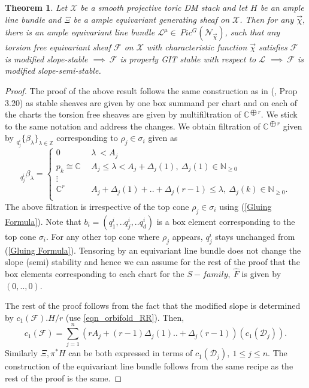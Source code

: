 \documentclass[10pt]{amsart}
\newtheorem{thm}[prop]{Theorem}
\newcommand{\sX}{{\mathcal X}}
\numberwithin{equation}{subsection}
\begin{document}
\begin{thm}\label{slope stability}
Let $\sX$ be a smooth projective toric DM stack and let  $H$ be an
ample line bundle and $\Xi$ be a ample equivariant generating sheaf on $\sX$. Then for any $\vec\chi,$ there is an ample equivariant line bundle
$\mathscr{L}^\mu\in\  Pic^G(\mathscr{N}_{\vec\chi})$, such that any torsion free equivariant sheaf $\mathscr{F}$ on $\sX$ with characteristic 
function $\vec\chi$ satisfies
$\mathscr{F}$ is modified slope-stable $\implies \ \mathscr{F}$  is properly GIT stable with respect to $\mathscr{L}$ $\implies\ \mathscr{F} $ is modified slope-semi-stable.    
\end{thm}
\begin{proof}
The proof of the above result follows the same construction as in (\cite{Koo2}, Prop 3.20) as stable sheaves are given by one box summand per chart and on each of the charts the torsion free sheaves are given by multifiltration of $\mathbb{C}^{\bigoplus r}$. We stick to the same notation and address the changes. \newline We obtain filtration of $\mathbb{C}^{\bigoplus r}$ given by $_{q^i_j}\{\beta_{\lambda}\}_{\lambda \in \mathbb{Z}}$ corresponding to $\rho_j\in \sigma_i$ given as
$$_{q^i_j}\beta_\lambda=\left\{ 
\begin{array}{ll}
0 & \ \ \lambda\ < A_j\ \\[2ex]
p_k \cong \mathbb{C} & \ \ A_j \leq \lambda < A_j+\Delta_j(1),\  \Delta_j(1) \in \mathbb{N}_{\geq0}\ \\[2ex]
\vdots\\
\mathbb{C}^r & \ \   A_j+\Delta_j(1)+..+\Delta_j(r-1)\leq \lambda,\ \Delta_j(k) \in \mathbb{N}_{\geq0}.\\\
\end{array}
\right.$$ 
The above filtration is irrespective of the top cone $\rho_j\in \sigma_i$ using (\ref{Gluing Formula}). Note that $b_i=(q^i_1,..q^i_j,..q^i_d)$ is a box element corresponding to the top cone $\sigma_i.$ For any other top cone where $\rho_j$ appears, $q^i_j$ stays unchanged from (\ref{Gluing Formula}). Tensoring by an equivariant line bundle does not change the slope (semi) stability and hence we can assume for the rest of the proof that the box elements corresponding to each chart for the $S-family,\ \hat F$ is given by $(0,..,0).$\par
The rest of the proof follows from the fact that the modified slope is determined by $c_1(\mathscr{F}).H/r$ (use \ref{eqn_orbifold_RR}). 
Then,
$$c_1(\mathscr{F})=\sum_{j=1}^{n}(rA_j+(r-1)\Delta_{j}(1)..+\Delta_j(r-1))(c_1(\mathscr{D}_j)).$$ Similarly $\Xi,\pi^*H$ can be both expressed in terms of $c_1(\mathscr{D}_j),\ 1\leq j \leq n.$
The construction of the equivariant line bundle follows from the same recipe as the rest of the proof is the same.
\end{proof}
\end{document}
